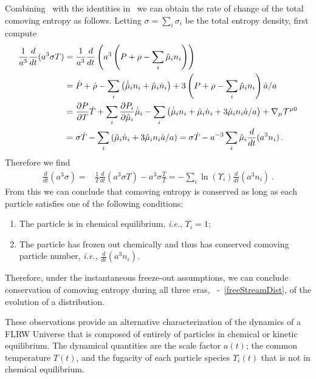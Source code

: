 Combining~ with the identities in~ we can obtain the rate of change of the total comoving entropy as follows. Letting $\sigma=\sum_i \sigma_i$ be the total entropy density, first compute
\begin{align}\frac{1}{a^3}\frac{d}{dt}(a^3\sigma T)&=\frac{1}{a^{3}}\frac{d}{dt}\left(a^3\left(P+\rho-\sum_i \hat{\mu}_i n_i\right)\right)\\
&=\dot{P}+\dot{\rho}-\sum_i \left(\dot{\hat{\mu}}_in_i+\hat{\mu}_i\dot{n}_i\right)+3\left(P+\rho-\sum_i \hat{\mu}_i n_i\right)\dot{a}/a\notag\\
&=\frac{\partial P}{\partial T} \dot{T}+\sum_i\frac{\partial P_i}{\partial \hat{\mu}_i} \dot{\hat{\mu}}_i-\sum_i \left(\dot{\hat{\mu}}_in_i+\hat{\mu}_i\dot{n}_i+3\hat{\mu}_i n_i \dot{a}/a\right)+\nabla_\mu \mathcal{T}^{\mu 0}\notag\\
&=\sigma\dot{T}-\sum_i \left(\hat{\mu}_i\dot{n}_i+3\hat{\mu}_i n_i \dot{a}/a\right)%
=\sigma\dot{T}- a^{-3}\sum_i\hat{\mu}_i\frac{d}{dt}(a^3n_i)\,.\notag
\end{align}
Therefore we find
\begin{align}\label{S:n:eq}
\frac{d}{dt}(a^3\sigma )=&\frac{1}{T}\frac{d}{dt}(a^3\sigma T)-a^3\sigma \frac{\dot T}{T}=-\sum_i\ln(\Upsilon_i)\frac{d}{dt}(a^3n_i)\,.
\end{align}
From this we can conclude that comoving entropy is conserved as long as each particle satisfies one of the following conditions:
\begin{enumerate}
\item
The particle is in chemical equilibrium, {\it i.e.\/}, $\Upsilon_i= 1$;
\item
The particle has frozen out chemically and thus has conserved comoving particle number, {\it i.e.\/}, $\frac{d}{dt}(a^3n_i)$. 
\end{enumerate}
Therefore, under the instantaneous freeze-out assumptions, we can conclude conservation of comoving entropy during all three eras, ~-~\eqref{freeStreamDist}, of the evolution of a distribution. 

These observations provide an alternative characterization of the dynamics of a FLRW Universe that is composed of entirely of particles in chemical or kinetic equilibrium. The dynamical quantities are the scale factor $a(t)$; the common temperature $T(t)$, and the fugacity of each particle species $\Upsilon_i(t)$ that is not in chemical equilibrium. 

